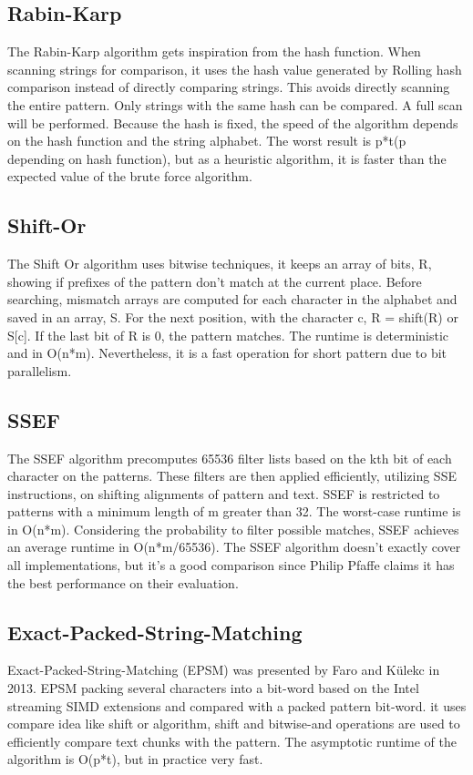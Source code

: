 \documentclass[11pt]{article}       %
\begin{document}
\subsection{Rabin-Karp}\label{rk}
The Rabin-Karp algorithm gets inspiration from the hash function. When scanning strings for comparison, it uses the hash value generated by Rolling hash comparison instead of directly comparing strings\cite{KR}. This avoids directly scanning the entire pattern. Only strings with the same hash can be compared. A full scan will be performed. Because the hash is fixed, the speed of the algorithm depends on the hash function and the string alphabet. The worst result is p*t(p depending on hash function), but as a heuristic algorithm, it is faster than the expected value of the brute force algorithm.

\subsection{Shift-Or}\label{so}
The Shift Or algorithm uses bitwise techniques\cite{Matching}, it keeps an array of bits, R, showing if prefixes of the pattern don't match at the current place. Before searching, mismatch arrays are computed for each character in the alphabet and saved in an array, S. For the next position, with the character c, R = shift(R) or S[c]. If the last bit of R is 0, the pattern matches. The runtime is deterministic and in O(n*m). Nevertheless, it is a fast operation for short pattern due to bit parallelism.

\subsection{SSEF}\label{SSEF}
The SSEF algorithm precomputes 65536 filter lists based on the kth bit of each character on the patterns\cite{Matching}. These filters are then applied efficiently, utilizing SSE instructions, on shifting alignments of pattern and text. SSEF is restricted to patterns with a minimum length of m greater than 32. The worst-case runtime is in O(n*m). Considering the probability to filter possible matches, SSEF achieves an average runtime in O(n*m/65536). The SSEF algorithm doesn't exactly cover all implementations, but it's a good comparison since Philip Pfaffe claims it has the best performance on their evaluation\cite{SSEF}.

\subsection{Exact-Packed-String-Matching}\label{EPSM}
Exact-Packed-String-Matching (EPSM) was presented by Faro and Külekc in 2013\cite{EPSM}. EPSM packing several characters into a bit-word based on the Intel streaming SIMD extensions and compared with a packed pattern bit-word. it uses compare idea like shift or algorithm, shift and bitwise-and operations are used to efficiently compare text chunks with the pattern. The asymptotic runtime of the algorithm is O(p*t), but in practice very fast.
\end{document}
